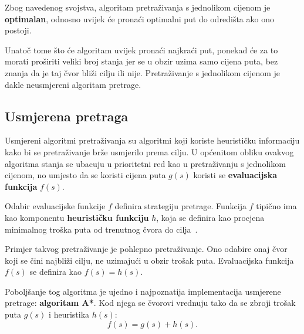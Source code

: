 \documentclass[times, utf8, zavrsni, numeric]{fer}
\begin{document}
\vspace{3mm}
\begin{minipage}{\textwidth}
	
\end{minipage}

\par Zbog navedenog svojstva, algoritam pretraživanja s jednolikom cijenom je \textbf{optimalan}, odnosno uvijek će pronaći optimalni put do odredišta ako ono postoji.

\par Unatoč tome što će algoritam uvijek pronaći najkraći put, ponekad će za to morati proširiti veliki broj stanja jer se u obzir uzima samo cijena puta, bez znanja da je taj čvor bliži cilju ili nije. 
Pretraživanje s jednolikom cijenom je dakle neusmjereni algoritam pretrage.

\subsection{Usmjerena pretraga}

\par Usmjereni algoritmi pretraživanja su algoritmi koji koriste heurističku informaciju kako bi se pretraživanje brže usmjerilo prema cilju.
U općenitom obliku ovakvog algoritma stanja se ubacuju u prioritetni red kao u pretraživanju s jednolikom cijenom, no umjesto da se koristi cijena puta \(g(s)\) koristi se \textbf{evaluacijska funkcija} \(f(s)\).

\par Odabir evaluacijske funkcije \(f\) definira strategiju pretrage. 
Funkcija \(f\) tipično ima kao komponentu \textbf{heurističku funkciju} \(h\), koja se definira kao procjena minimalnog troška puta od trenutnog čvora do cilja~\cite{book:AIModernApproach}.

\par Primjer takvog pretraživanje je pohlepno pretraživanje. 
Ono odabire onaj čvor koji se čini najbliži cilju, ne uzimajući u obzir trošak puta.
Evaluacijska funkcija \(f(s)\) se definira kao \(f(s) = h(s)\).

\par Poboljšanje tog algoritma je ujedno i najpoznatija implementacija usmjerene pretrage: \textbf{algoritam A*}. 
Kod njega se čvorovi vrednuju tako da se zbroji trošak puta \(g(s)\) i heuristika \(h(s)\):
\begin{equation}
f(s) = g(s) + h(s).
\end{equation} 
\end{document}
